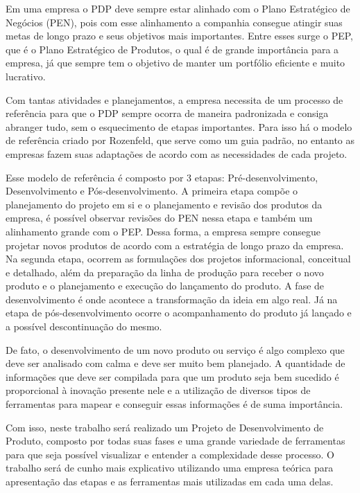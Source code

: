 \documentclass[
	12pt,				%
	openright,			%
	oneside,			%
	a4paper,			%
	english,			%
	french,				%
	spanish,			%
	brazil				%
	]{abntex2}
\begin{document}
Em uma empresa o PDP deve sempre estar alinhado com o Plano Estratégico de Negócios (PEN), pois com esse alinhamento a companhia consegue atingir suas metas de longo prazo e seus objetivos mais importantes. Entre esses surge o PEP, que é o Plano Estratégico de Produtos, o qual é de grande importância para a empresa, já que sempre tem o objetivo de manter um portfólio eficiente e muito lucrativo. \cite{rozenfeld}

Com tantas atividades e planejamentos, a empresa necessita de um processo de referência para que o PDP sempre ocorra de maneira padronizada e consiga abranger tudo, sem o esquecimento de etapas importantes. Para isso há o modelo de referência criado por Rozenfeld, que serve como um guia padrão, no entanto as empresas fazem suas adaptações de acordo com as necessidades de cada projeto. \cite{rozenfeld}

Esse modelo de referência é composto por 3 etapas: Pré-desenvolvimento, Desenvolvimento e Pós-desenvolvimento. A primeira etapa compõe o planejamento do projeto em si e o planejamento e revisão dos produtos da empresa, é possível observar revisões do PEN nessa etapa e também um alinhamento grande com o PEP. Dessa forma, a empresa sempre consegue projetar novos produtos de acordo com a estratégia de longo prazo da empresa. Na segunda etapa, ocorrem as formulações dos projetos informacional, conceitual e detalhado, além da preparação da linha de produção para receber o novo produto e o planejamento e execução do lançamento do produto. A fase de desenvolvimento é onde acontece a transformação da ideia em algo real. Já na etapa de pós-desenvolvimento ocorre o acompanhamento do produto já lançado e a possível descontinuação do mesmo. \cite{rozenfeld}

De fato, o desenvolvimento de um novo produto ou serviço é algo complexo que deve ser analisado com calma e deve ser muito bem planejado. A quantidade de informações que deve ser compilada para que um produto seja bem sucedido é proporcional à inovação presente nele e a utilização de diversos tipos de ferramentas para mapear e conseguir essas informações é de suma importância. 

Com isso, neste trabalho será realizado um Projeto de Desenvolvimento de Produto, composto por todas suas fases e uma grande variedade de ferramentas para que seja possível visualizar e entender a complexidade desse processo. O trabalho será de cunho mais explicativo utilizando uma empresa teórica para apresentação das etapas e as ferramentas mais utilizadas em cada uma delas.  
\end{document}
